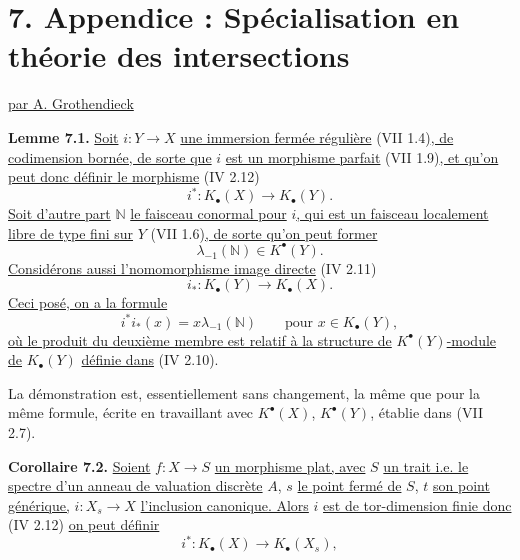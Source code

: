 
\section*{7. Appendice : Spécialisation en théorie des intersections}
\begin{center}
\underline{par A. Grothendieck}
\end{center}

\textbf{Lemme 7.1.} \uline{Soit} \(i:Y\to X\) \uline{une immersion fermée régulière} (VII 1.4)\uline{, de codimension bornée, de sorte que} \(i\) \uline{est un morphisme parfait} (VII 1.9)\uline{, et qu'on peut donc définir le morphisme} (IV 2.12)
\[
 i^*:K_\bullet(X)\longrightarrow K_\bullet(Y).
\]
\uline{Soit d'autre part} \(\mathbb N\) \uline{le faisceau conormal pour} \(i\)\uline{, qui est un faisceau localement libre de type fini sur} \(Y\) (VII 1.6)\uline{, de sorte qu'on peut former}
\[
 \lambda_{-1}(\mathbb N)\in K^{\bullet}(Y).
\]
\uline{Considérons aussi l'nomomorphisme image directe} (IV 2.11)
\[
 i_*:K_\bullet(Y)\longrightarrow K_\bullet(X).
\]
\uline{Ceci posé, on a la formule}
\[
 i^*i_*(x)=x\lambda_{-1}(\mathbb N)\qquad\text{pour } x\in K_\bullet(Y),
\]
\uline{où le produit du deuxième membre est relatif à la structure de} \(K^{\bullet}(Y)\)\uline{-module de} \(K_\bullet(Y)\) \uline{définie dans} (IV 2.10).

La démonstration est, essentiellement sans changement, la même que pour la même formule, écrite en travaillant avec \(K^{\bullet}(X)\), \(K^{\bullet}(Y)\), établie dans (VII 2.7).

\textbf{Corollaire 7.2.} \uline{Soient} \(f:X\to S\) \uline{un morphisme plat, avec} \(S\) \uline{un trait i.e. le spectre d'un anneau de valuation discrète} \(A\), \(s\) \uline{le point fermé de} \(S\), \(t\) \uline{son point générique,} \(i:X_s\to X\) \uline{l'inclusion canonique. Alors} \(i\) \uline{est de tor-dimension finie donc} (IV 2.12) \uline{on peut définir}
\[
 i^*:K_\bullet(X)\longrightarrow K_\bullet(X_s),
\]
